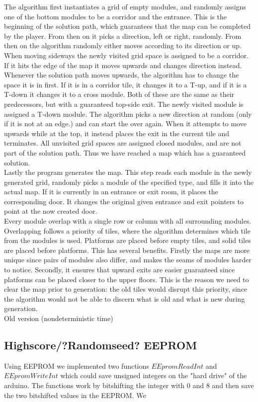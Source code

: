 The algorithm first instantiates a grid of empty modules, and randomly assigns one of the bottom modules to be a corridor and the entrance. This is the beginning of the solution path, which guarantees that the map can be completed by the player. From then on it picks a direction, left or right, randomly. From then on the algorithm randomly either moves according to its direction or up. When moving sideways the newly visited grid space is assigned to be a corridor. If it hits the edge of the map it moves upwards and changes direction instead. Whenever the solution path moves upwards, the algorithm has to change the space it is in first. If it is in a corridor tile, it changes it to a T-up, and if it is a T-down it changes it to a cross module. Both of these are the same as their predecessors, but with a guaranteed top-side exit. The newly visited module is assigned a T-down module. The algorithm picks a new direction at random (only if it is not at an edge.) and can start the over again. When it attempts to move upwards while at the top, it instead places the exit in the current tile and terminates. All unvisited grid spaces are assigned closed modules, and are not part of the solution path. Thus we have reached a map which has a guaranteed solution.\\
Lastly the program generates the map. This step reads each module in the newly generated grid, randomly picks a module of the specified type, and fills it into the actual map. If it is currently in an entrance or exit room, it places the corresponding door. It changes the original given entrance and exit pointers to
point at the now created door.\\
Every module overlap with a single row or column with all surrounding modules. Overlapping follows a priority of tiles, where the algorithm determines which tile from the modules is used. Platforms are placed before empty tiles, and solid tiles are placed before platforms. This has several benefits. Firstly the maps are more unique since pairs of modules also differ, and makes the seams of modules harder to notice. Secondly, it ensures that upward exits are easier guaranteed since platforms can be placed closer to the upper floors. This is the reason we need to clear the map prior to generation: the old tiles would disrupt this priority, since the algorithm would not be able to discern what is old and what is new during
generation.\\
Old version (nondeterministic time)

\subsection{Highscore/?Randomseed? EEPROM}
Using EEPROM we implemented two functions $EEpromReadInt$ and $EEpromWriteInt$ which could save unsigned integers on the "hard drive" of the arduino. The functions work by bitshifting the integer with 0 and 8 and then save the two bitshifted values in the EEPROM. We 



